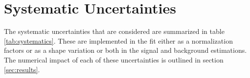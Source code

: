 \documentclass[NOTE, atlasdraft=true, texlive=2016, UKenglish]{\ATLASLATEXPATH atlasdoc}
\begin{document}




\section{Systematic Uncertainties}
\label{sec:sys}

The systematic uncertainties that are considered are summarized in table \ref{tab:systematics}. These are implemented in the fit either as a normalization factors or as a shape variation or both in the signal and background estimations. The numerical impact of each of these uncertainties is outlined in section \ref{sec:results}.
\end{document}
